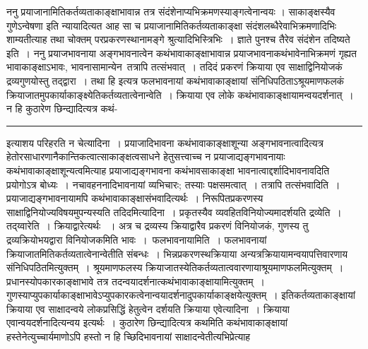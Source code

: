 \documentclass[11pt, openany]{book}
\makeatletter
\def\blfootnote{\gdef\@thefnmark{}\@footnotetext}
\makeatother
\begin{document}
 {\br ननु} प्रयाजानामितिकर्तव्यताकाङ्क्षाभावान्न तत्र संदंशेनाप्यभिक्रमणस्याङ्गत्वेनान्वयः । {\qt साकाङ्क्षस्यैव गुणेऽन्वेषणा} इति न्यायादित्यत आह सा च प्रयाजानामितिकर्तव्यताकाङ्क्षा संदंशलब्धैरेवाभिक्रमणादिभिः शाम्यतीत्याह तथा चोक्तम् {\qt परप्रकरणस्थानामङ्गे श्रुत्यादिभिस्त्रिभिः~। ज्ञाते पुनश्च तैरेव संदंशेन तदिष्यते} इति~। {\br ननु} प्रयाजभावनाया अङ्गभावनात्वेन कथंभावाकाङ्क्षाभावान्न प्रयाजभावनाकथंभावेनाभिक्रमणं गृह्यत
\newpage
\fancyhead[LO]{[कथंभावाकाङ्क्षा]}
{\bl\noindent
भावाकाङ्क्षाऽभावः, भावनासामान्येन\footnotemark\ तत्रापि तत्संभवात्~। तदिदं प्रकरणं क्रियाया एव साक्षाद्विनियोजकं द्रव्यगुणयोस्तु तद्द्वारा~। तथा हि इत्यत्र फलभावनायां कथंभावाकाङ्क्षायां संनिधिपठिताऽश्रूयमाणफलकं क्रियाजातमुपकार्याकाङ्क्ष्येतिकर्तव्यतात्वेनान्वेति~। क्रियाया एव लोके
कथंभावाकाङ्क्षायामन्वयदर्शनात्~। न हि कुठारेण छिन्द्यादित्यत्र कथं-\\}
\hrule
\vspace{3mm}
\noindent
 इत्याशय परिहरति {\br न चेत्यादिना~।} प्रयाजादिभावना कथंभावाकाङ्क्षाशून्या अङ्गभावनात्वादित्यत्र हेतोरसाधारणानैकान्तिकत्वात्साकाङ्क्षत्वसाधने हेतुसत्त्वाच्च न
प्रयाजाद्यङ्गभावनायाः कथंभावाकाङ्क्षाशून्यत्वमित्याह प्रयाजाद्यङ्गभावना कथंभावसाकाङ्क्षा भावनात्वाद्दर्शादिभावनावदिति
प्रयोगोऽत्र बोध्यः~। नचावहननादिभावनायां व्यभिचारः; तस्याः पक्षसमत्वात्~। {\br तत्रापि तत्संभवादिति~।} प्रयाजाद्यङ्गभावनायामपि कथंभावाकाङ्क्षासंभवादित्यर्थः~। निरूपितप्रकरणस्य साक्षाद्विनियोज्यविषयमुपन्यस्यति {\br तदिदमित्यादिना~।} प्रकृतस्यैव व्यवहितविनियोज्यमादर्शयति {\br द्रव्येति~। तद्य्वारेति~।} क्रियाद्वारेत्यर्थः
~। अत्र च द्रव्यस्य क्रियाद्वारैव प्रकरणं विनियोजकं, गुणस्य तु द्रव्यक्रियोभयद्वारा विनियोजकमिति भावः~।~{\br फलभावनायामिति~।} फलभावनायां क्रियाजातमितिकर्तव्यतात्वेनान्वेतीति संबन्धः~। भिन्नप्रकरणस्थक्रियाया अन्यत्रक्रियायामन्वयापत्तिवारणाय संनिधिपठितमित्युक्तम्~। श्रूयमाणफलस्य
क्रियाजातस्येतिकर्तव्यतात्ववारणायाश्रूयमाणफलमित्युक्तम्~। प्रधानस्योपकारकाङ्क्षाभावे तत्र तदन्वयादर्शनात्कथंभावाकाङ्क्षायामित्युक्तम्~।
गुणस्याप्युपकार्याकाङ्क्षाभावेऽप्युपकारकत्वेनान्वयादर्शनादुपकार्याकाङ्क्षयेत्युक्तम्~। इतिकर्तव्यताकाङ्क्षायां क्रियाया एव साक्षादन्वये लोकप्रसिद्धिं हेतुत्वेन दर्शयति {\br क्रियाया एवेत्यादिना~।} क्रियाया एवान्वयदर्शनादित्यन्वय इत्यर्थः~। कुठारेण छिन्द्यादित्यत्र कथमिति कथंभावाकाङ्क्षायां हस्तेनेत्युच्चार्यमाणोऽपि हस्तो न हि च्छिदिभावनायां
साक्षादन्वेतीत्यभिप्रेत्याह
\blfootnote{पाठा०\textemdash\ $^{१}$साम्येन.}
\newpage
\end{document}
